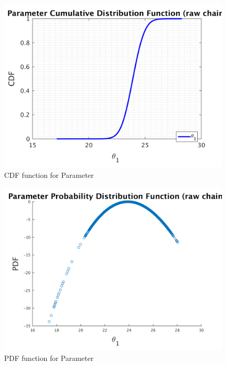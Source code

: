 \begin{figure}[H]
  
  \centering
   \includegraphics[scale=0.75]{100_results/outputData_700000/simple_ip_cdf_raw}
   \caption{CDF function for Parameter }
\end{figure}



\begin{figure}[H]
  
  \centering
   \includegraphics[scale=0.75]{100_results/outputData_700000/ip_logLike_unified}
   \caption{PDF function for Parameter }
\end{figure}




